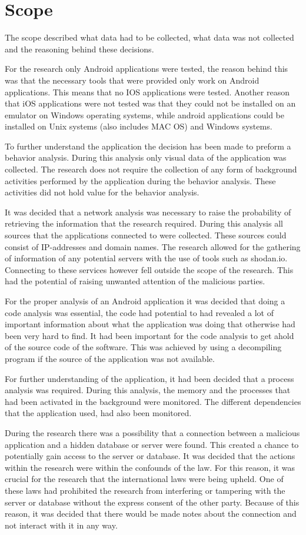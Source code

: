 \section{Scope}

The scope described what data had to be collected, what data was not collected and the reasoning behind these decisions.

For the research only Android applications were tested, the reason behind this was that the necessary tools that were provided only work on Android applications. This means that no IOS applications were tested. Another reason that iOS applications were not tested was that they could not be installed on an emulator on Windows operating systems, while android applications could be installed on Unix systems (also includes MAC OS) and Windows systems.

To further understand the application the decision has been made to preform a behavior analysis. During this analysis only visual data of the application was collected. The research does not require the collection of any form of background activities performed by the application during the behavior analysis. These activities did not hold value for the behavior analysis.

It was decided that a network analysis was necessary to raise the probability of retrieving the information that the research required. During this analysis all sources that the applications connected to were collected. These sources could consist of IP-addresses and domain names. The research allowed for the gathering of information of any potential servers with the use of tools such as shodan.io. Connecting to these services however fell outside the scope of the research. This had the potential of raising unwanted attention of the malicious parties.

For the proper analysis of an Android application it was decided that doing a code analysis was essential, the code had potential to had revealed a lot of important information about what the application was doing that otherwise had been very hard to find. It had been important for the code analysis to get ahold of the source code of the software. This was achieved by using a decompiling program if the source of the application was not available.

For further understanding of the application, it had been decided that a process analysis was required. During this analysis, the memory and the processes that had been activated in the background were monitored. The different dependencies that the application used, had also been monitored.

During the research there was a possibility that a connection between a malicious application and a hidden database or server were found. This created a chance to potentially gain access to the server or database. It was decided that the actions within the research were within the confounds of the law. For this reason, it was crucial for the research that the international laws were being upheld. One of these laws had prohibited the research from interfering or tampering with the server or database without the express consent of the other party. Because of this reason, it was decided that there would be made notes about the connection and not interact with it in any way.